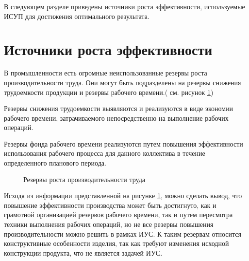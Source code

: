 В следующем разделе приведены источники роста эффективности, используемые ИСУП для достижения оптимального результата. 

\section{Источники роста эффективности}

В промышленности есть огромные неиспользованные резервы роста производительности труда. Они могут быть подразделены на резервы снижения трудоемкости продукции и резервы рабочего времени.( см. рисунок \ref{ris:reserve1})

Резервы снижения трудоемкости выявляются и реализуются в виде экономии рабочего времени, затрачиваемого непосредственно на выполнение рабочих операций.

Резервы фонда рабочего времени реализуются путем повышения эффективности использования рабочего процесса для данного коллектива в течение определенного планового периода\cite{Lenin}. 


\begin{figure}[H]
    \caption{Резервы роста производительности труда}
    \label{ris:reserve1}
\end{figure}

Исходя из информации представленной на рисунке \ref{ris:reserve1}, можно сделать вывод, что повышение эффективности производства может быть достигнуто, как и грамотной организацией резервов рабочего времени, так и путем пересмотра техники выполнения рабочих операций, но не все резервы повышения производительности можно решить в рамках ИУС. К таким резервам относится конструктивные особенности изделия, так как требуют изменения исходной конструкции продукта, что не является задачей ИУС. 


